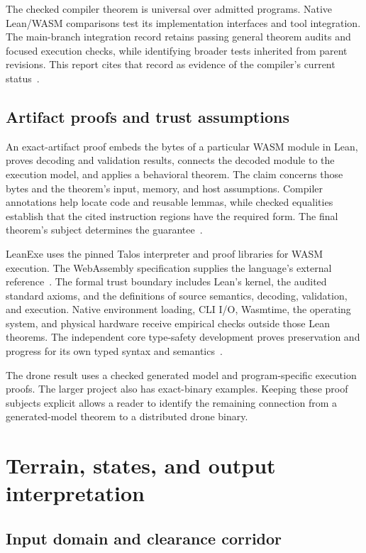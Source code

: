 \documentclass[11pt]{article}
\begin{document}
The checked compiler theorem is universal over admitted programs.  Native Lean/WASM comparisons test its implementation interfaces and tool integration.  The main-branch integration record retains passing general theorem audits and focused execution checks, while identifying broader tests inherited from parent revisions.  This report cites that record as evidence of the compiler's current status~\cite{main-integration}.

\subsection{Artifact proofs and trust assumptions}

An exact-artifact proof embeds the bytes of a particular WASM module in Lean, proves decoding and validation results, connects the decoded module to the execution model, and applies a behavioral theorem.  The claim concerns those bytes and the theorem's input, memory, and host assumptions.  Compiler annotations help locate code and reusable lemmas, while checked equalities establish that the cited instruction regions have the required form.  The final theorem's subject determines the guarantee~\cite{leanexe-main}.

LeanExe uses the pinned Talos interpreter and proof libraries for WASM execution.  The WebAssembly specification supplies the language's external reference~\cite{wasm}.  The formal trust boundary includes Lean's kernel, the audited standard axioms, and the definitions of source semantics, decoding, validation, and execution.  Native environment loading, CLI I/O, Wasmtime, the operating system, and physical hardware receive empirical checks outside those Lean theorems.  The independent core type-safety development proves preservation and progress for its own typed syntax and semantics~\cite{leanexe-main,compiler-correctness}.

The drone result uses a checked generated model and program-specific execution proofs.  The larger project also has exact-binary examples.  Keeping these proof subjects explicit allows a reader to identify the remaining connection from a generated-model theorem to a distributed drone binary.

\section{Terrain, states, and output interpretation}
\label{sec:model}

\subsection{Input domain and clearance corridor}
\end{document}
